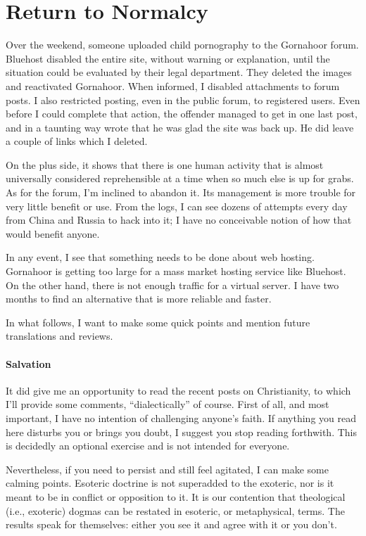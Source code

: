 \section{Return to Normalcy}

Over the weekend, someone uploaded child pornography to the Gornahoor forum. Bluehost disabled the entire site, without warning or explanation, until the situation could be evaluated by their legal department. They deleted the images and reactivated Gornahoor. When informed, I disabled attachments to forum posts. I also restricted posting, even in the public forum, to registered users. Even before I could complete that action, the offender managed to get in one last post, and in a taunting way wrote that he was glad the site was back up. He did leave a couple of links which I deleted.

On the plus side, it shows that there is one human activity that is almost universally considered reprehensible at a time when so much else is up for grabs. As for the forum, I'm inclined to abandon it. Its management is more trouble for very little benefit or use. From the logs, I can see dozens of attempts every day from China and Russia to hack into it; I have no conceivable notion of how that would benefit anyone.

In any event, I see that something needs to be done about web hosting. Gornahoor is getting too large for a mass market hosting service like Bluehost. On the other hand, there is not enough traffic for a virtual server. I have two months to find an alternative that is more reliable and faster.

In what follows, I want to make some quick points and mention future translations and reviews.

\paragraph{Salvation}


It did give me an opportunity to read the recent posts on Christianity, to which I'll provide some comments, ``dialectically'' of course. First of all, and most important, I have no intention of challenging anyone's faith. If anything you read here disturbs you or brings you doubt, I suggest you stop reading forthwith. This is decidedly an optional exercise and is not intended for everyone.

Nevertheless, if you need to persist and still feel agitated, I can make some calming points. Esoteric doctrine is not superadded to the exoteric, nor is it meant to be in conflict or opposition to it. It is our contention that theological (i.e., exoteric) dogmas can be restated in esoteric, or metaphysical, terms. The results speak for themselves: either you see it and agree with it or you don't.

